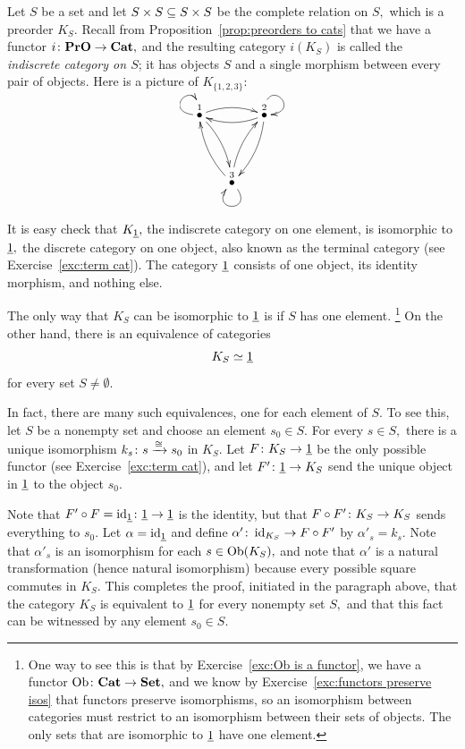 \documentclass[../main/CT4S-EN-RU]{subfiles}
\begin{document}
\begin{exerciseRUS}
\end{exerciseRUS}

\begin{exampleENG}\label{ex:indiscrete cat equiv to terminal}
Let $S$ be a set and let $S\times S\ss S\times S$ be the complete relation on $S,$ which is a preorder $K_S.$ Recall from Proposition~\ref{prop:preorders to cats} that we have a functor $i\taking\PrO\to\Cat,$ and the resulting category $i(K_S)$ is called the {\em indiscrete category on $S$}; it has objects $S$ and a single morphism between every pair of objects. Here is a picture of $K_{\{1,2,3\}}$:
$$\xymatrix@=15pt{\LMO{1}\ar@(l,u)[]\ar@/^.5pc/[rr]\ar@/^.5pc/[rdd]&&\LMO{2}\ar@(u,r)[]\ar@/^.5pc/[ll]\ar@/^.5pc/[ldd]\\\\&\LMO{3}\ar@(dr,dl)[]_~\ar@/^.5pc/[uur]\ar@/^.5pc/[uul]}$$

It is easy check that $K_{\ul{1}},$ the indiscrete category on one element, is isomorphic to $\ul{1},$ the discrete category on one object, also known as the terminal category (see Exercise~\ref{exc:term cat}). The category $\ul{1}$ consists of one object, its identity morphism, and nothing else. 

The only way that $K_S$ can be isomorphic to $\ul{1}$ is if $S$ has one element.
\footnote{One way to see this is that by Exercise~\ref{exc:Ob is a functor}, we have a functor $\Ob\taking\Cat\to\Set,$ and we know by Exercise~\ref{exc:functors preserve isos} that functors preserve isomorphisms, so an isomorphism between categories must restrict to an isomorphism between their sets of objects. The only sets that are isomorphic to $\ul{1}$ have one element.} 
On the other hand, there is an equivalence of categories $$K_S\simeq\ul{1}$$ for every set $S\neq\emptyset.$ 

In fact, there are many such equivalences, one for each element of $S.$ To see this, let $S$ be a nonempty set and choose an element $s_0\in S.$ For every $s\in S,$ there is a unique isomorphism $k_s\taking s\To{\iso}s_0$ in $K_S.$ Let $F\taking K_S\to\ul{1}$ be the only possible functor (see Exercise~\ref{exc:term cat}), and let $F'\taking\ul{1}\to K_S$ send the unique object in $\ul{1}$ to the object $s_0.$ 

Note that $F'\circ F=\id_{\ul{1}}\taking\ul{1}\to\ul{1}$ is the identity, but that $F\circ F'\taking K_S\to K_S$ sends everything to $s_0.$ Let $\alpha=\id_{\ul{1}}$ and define $\alpha'\taking\id_{K_S}\to F\circ F'$ by $\alpha'_s=k_s.$ Note that $\alpha'_s$ is an isomorphism for each $s\in\Ob(K_S),$ and note that $\alpha'$ is a natural transformation (hence natural isomorphism) because every possible square commutes in $K_S.$ This completes the proof, initiated in the paragraph above, that the category $K_S$ is equivalent to $\ul{1}$ for every nonempty set $S,$ and that this fact can be witnessed by any element $s_0\in S.$
\end{exampleENG}
\end{document}
